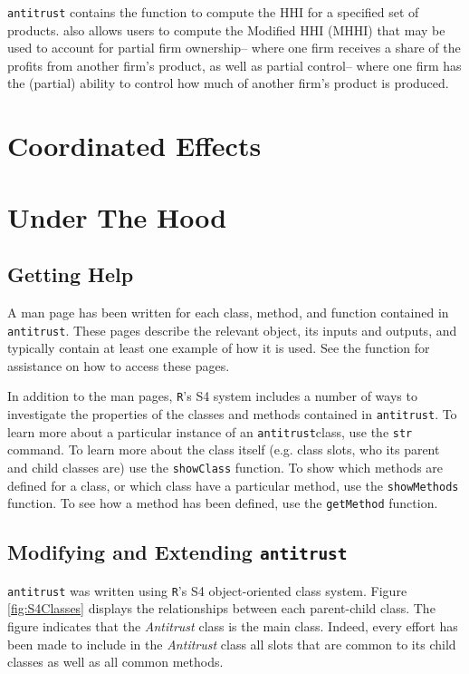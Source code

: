 \documentclass[11pt,numbers=noenddot,pointlessnumbers]{scrreprt}
\newcommand{\rlan}{{\tt R}}
\newcommand{\atr}{{\tt antitrust}}
\numberwithin{equation}{section}
\begin{document}
\atr{} contains the \verb@HHI@ function to compute the HHI for a
specified set of products. \verb@HHI@
also allows users to compute the Modified HHI (MHHI) that may be used
to account for partial firm ownership-- where one firm receives
a share of the profits from another firm's product, as well as
partial control-- where one firm has the (partial) ability to control
how much of another firm's product is produced.

\part{Coordinated Effects}

\part{Under The Hood}
\chapter{Getting Help}

A man page has been written for each class, method, and function
contained in \atr . These pages describe the relevant object, its
inputs and outputs, and typically contain at least one example of how
it is used. See the \verb@help@ function for assistance on how to
access these pages.

In addition to the man pages, \rlan's S4 system includes a number of
ways to investigate the properties of the classes and methods
contained in \atr. To learn more about a particular instance of an
\atr class, use the \texttt{str} command. To learn more about the class itself
(e.g. class slots, who its parent and child classes are) use the
\texttt{showClass} function. To show which methods are defined for a
class, or which class have a particular method, use the \texttt{showMethods} function. To see how a method has
been defined, use the \texttt{getMethod} function.

\chapter{Modifying and Extending \atr{}}
\atr{} was written using \rlan's S4 object-oriented class
system. Figure \ref{fig:S4Classes} displays the relationships between
each parent-child class. The figure indicates that the
\emph{Antitrust} class is the main class. Indeed, every effort has
been made to include in the \emph{Antitrust} class all slots that are common
to its child classes as well as all common methods.
\end{document}
